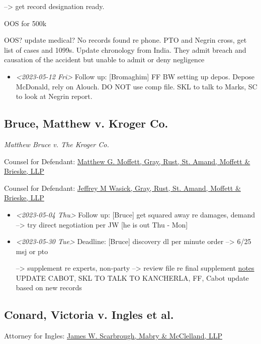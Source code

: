 \documentclass[11pt]{article}
\begin{document}
--> get record designation ready. 

OOS for 500k

OOS? update medical? No records found re phone.  PTO and Negrin cross, get list of cases and 1099s. Update chronology from India. They admit breach and causation of the accident but unable to admit or deny negligence

\begin{itemize}
\item \textit{<2023-05-12 Fri> } Follow up: [Bromaghim] FF BW setting up depos. Depose McDonald, rely on Alouch. DO NOT use comp file. SKL to talk to Marks, SC to look at Negrin report.
\end{itemize}

\subsection*{Bruce, Matthew v. Kroger Co.}
\label{sec:org77a5686}

\emph{Matthew Bruce v. The Kroger Co.}

Counsel for Defendant: \href{https://gabar.reliaguide.com/lawyer/30326-GA-Matthew-Moffett-254910}{Matthew G. Moffett, Gray, Rust, St. Amand, Moffett \& Brieske, LLP}

Counsel for Defendant: \href{https://gabar.reliaguide.com/lawyer/30326-GA-Jeffrey-Wasick-268609}{Jeffrey M Wasick, Gray, Rust, St. Amand, Moffett \& Brieske, LLP}

\begin{itemize}
\item \textit{<2023-05-04 Thu> } Follow up: [Bruce] get squared away re damages, demand --> try direct negotiation per JW [he is out Thu - Mon]

\item \textit{<2023-05-30 Tue> } Deadline: [Bruce] discovery dl per minute order --> 6/25 msj or pto

--> supplement re experts, non-party --> review file re final supplement \href{file:///Users/pmenair/Documents/WORK SYNC/projects/5-CaseFiles/Bruce.org}{notes} UPDATE CABOT, SKL TO TALK TO KANCHERLA, FF, Cabot update based on new records
\end{itemize}

\subsection*{Conard, Victoria v. Ingles et al.}
\label{sec:org16a9bff}

Attorney for Ingles: \href{https://www.gabar.org/MemberSearchDetail.cfm?ID=NjI4MzI4}{James W. Scarbrough, Mabry \& McClelland, LLP}
\end{document}
